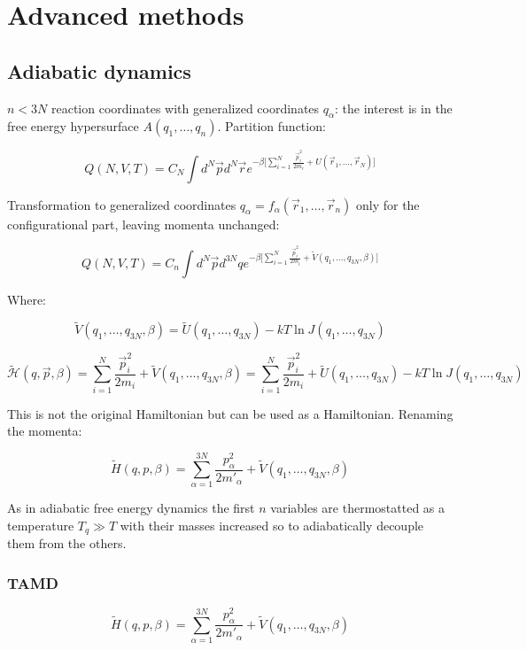 \graphicspath{{chapters/20/images/}}
\chapter{Advanced methods}

\section{Adiabatic dynamics}
$n<3N$ reaction coordinates with generalized coordinates $q_\alpha$: the interest is in the free energy hypersurface $A(q_1, \dots, q_n)$.
Partition function:

$$Q(N, V, T) = C_N\int d^N\vec{p}d^N\vec{r}e^{-\beta\biggl[\sum\limits_{i=1}^N\frac{\vec{p}_i^2}{2m_i}+U(\vec{r}_1, \dots, \vec{r}_N)\biggr]}$$

Transformation to generalized coordinates $q_\alpha = f_\alpha(\vec{r}_1, \dots, \vec{r}_n)$ only for the configurational part, leaving momenta unchanged:

$$Q(N, V, T) = C_n\int d^N\vec{p}d^{3N}qe^{-\beta\biggl[\sum\limits_{i=1}^N\frac{\vec{p}_i^2}{2m_i} + \tilde{V}(q_1, \dots, q_{3N}, \beta)\biggr]}$$

Where:

$$\tilde{V}(q_1, \dots, q_{3N}, \beta) = \tilde{U}(q_1, \dots, q_{3N}) - kT\ln J(q_1, \dots, q_{3N})$$

$$\tilde{\mathcal{H}}(q, \vec{p}, \beta) = \sum\limits_{i=1}^N\frac{\vec{p}_i^2}{2m_i}+\tilde{V}(q_1, \dots, q_{3N}, \beta) = \sum\limits_{i=1}^N\frac{\vec{p}_i^2}{2m_i}+\tilde{U}(q_1, \dots, q_{3N})-kT\ln J(q_1, \dots, q_{3N})$$

This is not the original Hamiltonian but can be used as a Hamiltonian.
Renaming the momenta:

$$\tilde{H}(q, p, \beta) = \sum\limits_{\alpha=1}^{3N}\frac{p_\alpha^2}{2m'_\alpha}+ \tilde{V}(q_1, \dots, q_{3N}, \beta)$$

As in adiabatic free energy dynamics the first $n$ variables are thermostatted as a temperature $T_q\gg T$ with their masses increased so to adiabatically decouple them from the others.

	\subsection{TAMD}

	$$\tilde{H}(q, p, \beta) = \sum\limits_{\alpha=1}^{3N}\frac{p_\alpha^2}{2m'_\alpha} + \tilde{V}(q_1, \dots, q_{3N}, \beta)$$

